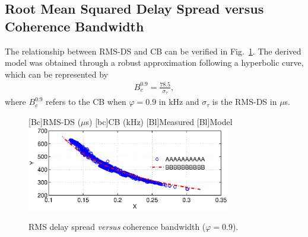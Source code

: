\documentclass[journal]{IEEEtran}
\newcommand{\tamfig}{3.5in}    %
\begin{document}
	\subsection{Root Mean Squared Delay Spread versus Coherence Bandwidth}
	
	The relationship between RMS-DS and CB can be verified in Fig.~\ref{Fig:RMSDSxBC}. The derived model was obtained through a robust approximation following a hyperbolic curve, which can be represented by
	\begin{eqnarray} \label{eq-RMSDSxBC}
	B_c^{0.9} = \frac{78.5}{\sigma_{\tau}},    
	\end{eqnarray}
	where $B_c^{0.9}$ refers to the CB when $\varphi=0.9$ in kHz and $\sigma_{\tau}$ is the RMS-DS in $\mu$s.
	
	\begin{figure}[!htp]
		\begin{centering}
			[Bc]{RMS-DS ($\mu$s)}    
			[bc]{CB (kHz)}
			[Bl]{Measured}
			[Bl]{Model}
			\includegraphics[width=\tamfig]{Figuras/RMSDSxBC.eps}
			\caption{RMS delay spread \emph{versus} coherence bandwidth ($\varphi = 0.9$).}
			\label{Fig:RMSDSxBC}
		\end{centering}
	\end{figure}
	
\end{document}
